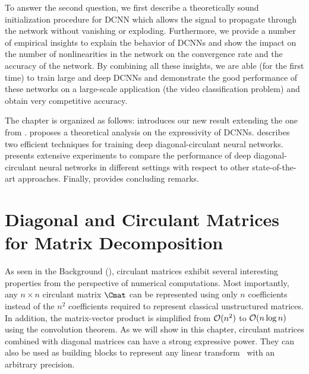 To answer the second question, we first describe a theoretically sound initialization procedure for DCNN which allows the signal to propagate through the network without vanishing or exploding.
Furthermore, we provide a number of empirical insights to explain the behavior of DCNNs and show the impact on the number of nonlinearities in the network on the convergence rate and the accuracy of the network. 
By combining all these insights, we are able (for the first time) to train large and deep DCNNs and demonstrate the good performance of these networks on a large-scale application (the \yt video classification problem) and obtain very competitive accuracy. 

The chapter is organized as follows:
 introduces our new result extending the one from \citet{huhtanen2015factoring}.
 proposes a theoretical analysis on the expressivity of DCNNs.
 describes two efficient techniques for training deep diagonal-circulant neural networks.
 presents extensive experiments to compare the performance of deep diagonal-circulant neural networks in different settings with respect to other state-of-the-art approaches.
Finally,  provides concluding remarks.




\section{Diagonal and Circulant Matrices for Matrix Decomposition}
\label{section:ch4-diagonal_and_circulant_matrices_for_matrix_decomposition}

As seen in the Background (), circulant matrices exhibit several interesting properties from the perspective of numerical computations.
Most importantly, any $n \times n$ circulant matrix $\Cmat$ can be represented using only $n$ coefficients instead of the $n^2$ coefficients required to represent classical unstructured matrices.
In addition, the matrix-vector product is simplified from $\mathcal{O}(n^2)$ to $\mathcal{O}(n \log n)$ using the  convolution theorem.
As we will show in this chapter, circulant matrices combined with diagonal matrices can have a strong expressive power.
They can also be used as building blocks to represent any linear transform~\cite{schmid2000decomposing,huhtanen2015factoring} with an arbitrary precision.

